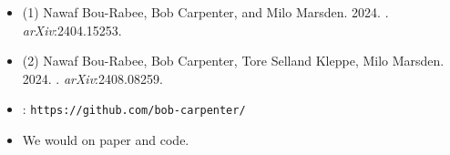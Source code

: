 \documentclass[10pt]{report}
\begin{document}
\begin{itemize}
\item (1) Nawaf Bou-Rabee, Bob Carpenter, and Milo Marsden. 2024. . \textit{arXiv}:2404.15253. 
\item (2) Nawaf Bou-Rabee, Bob Carpenter, Tore Selland Kleppe, Milo Marsden. 2024. . \textit{arXiv}:2408.08259.
\vspace*{12pt}  
\item {}: \texttt{https://github.com/bob-carpenter/}
\vfill 
\item We would  on paper and code.
\end{itemize}
\end{document}
